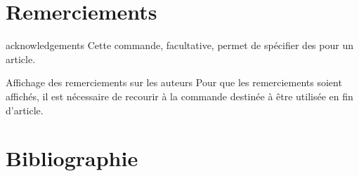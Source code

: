 \documentclass[french,nolocaltoc]{nwejmart}
\newtheorem[title=Fait,style=definition]{fact}
\begin{document}
\section{Remerciements}
\label{sec:remerciements}

\begin{docCommand}{acknowledgements}{}
  Cette commande, facultative, permet de spécifier des  pour
  un article.
\end{docCommand}

\begin{bodycode}
\end{bodycode}

\begin{dbremark}{Affichage des remerciements sur les auteurs}{}
  Pour que les remerciements soient affichés, il est nécessaire de recourir à la
  commande  destinée à être utilisée en fin d'article.
\end{dbremark}

\section{Bibliographie}
\label{sec-bibliographie}
\end{document}
